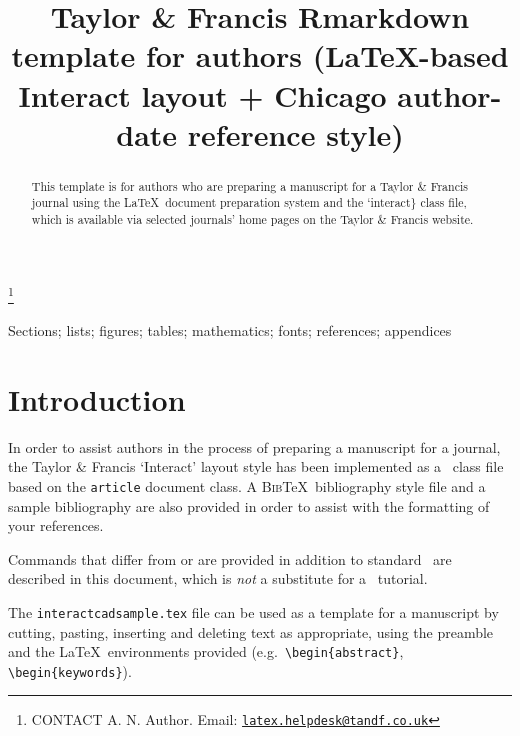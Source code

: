 \documentclass[]{interact}
\theoremstyle{plain}%
\theoremstyle{definition}
\theoremstyle{remark}
\begin{document}

\title{Taylor \& Francis Rmarkdown template for authors (\LaTeX-based
\textsf{Interact} layout + Chicago author-date reference style)}


\author{
}

\thanks{CONTACT A. N. Author. Email: \href{mailto:latex.helpdesk@tandf.co.uk}{\nolinkurl{latex.helpdesk@tandf.co.uk}}}

\maketitle

\begin{abstract}
This template is for authors who are preparing a manuscript for a Taylor \&
Francis journal using the \LaTeX~document preparation system and the
`interact\} class file, which is available via selected journals' home
pages on the Taylor \& Francis website.
\end{abstract}

\begin{keywords}
Sections; lists; figures; tables; mathematics; fonts; references; appendices
\end{keywords}

\hypertarget{introduction}{%
\section{Introduction}\label{introduction}}

In order to assist authors in the process of preparing a manuscript for a journal, the Taylor \& Francis `\textsf{Interact}' layout style has been implemented as a \LaTeXe~class file based on the \texttt{article} document class. A \textsc{Bib}\TeX~bibliography style file and a sample bibliography are also provided in order to assist with the formatting of your references.

Commands that differ from or are provided in addition to standard \LaTeXe~are described in this document, which is \emph{not} a substitute for a \LaTeXe~tutorial.

The \texttt{interactcadsample.tex} file can be used as a template for a manuscript by cutting, pasting, inserting and deleting text as appropriate, using the preamble and the \LaTeX~environments provided (e.g.~\texttt{\textbackslash{}begin\{abstract\}}, \texttt{\textbackslash{}begin\{keywords\}}).
\end{document}
